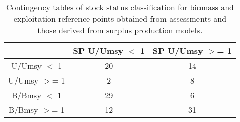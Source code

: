 \begin{table}[ht]
\begin{center}
\begin{tabular}{ccc}
  \hline
 & SP U/Umsy $<$ 1 & SP U/Umsy $>$= 1 \\ 
  \hline
U/Umsy $<$ 1 &  20 &  14 \\ 
  U/Umsy $>$= 1 &   2 &   8 \\ 
  B/Bmsy $<$ 1 &  29 &   6 \\ 
  B/Bmsy $>$= 1 &  12 &  31 \\ 
   \hline
\end{tabular}
\caption{Contingency tables of stock status classification for biomass and exploitation reference points obtained from assessments and those derived from surplus production models. }
\label{tab:contingency}
\end{center}
\end{table}
